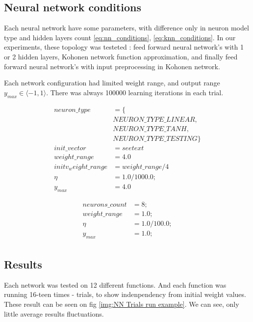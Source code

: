 \documentclass[times]{cpeauth}
\begin{document}
\subsection{Neural network conditions}
Each neural network have some parameters, with difference only in neuron model type
and hidden layers count \ref{eq:nn_conditions}, \ref{eq:knn_conditions}. In our experiments,
these topology was testeted :
feed forward neural network's with 1 or 2 hidden layers, Kohonen network function approximation,
and finally feed forward neural network's with input preprocessing in Kohonen network.

Each network configuration had limited weight range, and output range $y_{max} \in \langle -1, 1 \rangle$.
There was always 100000 learning iterations in each trial.

\begin{align}
\label{eq:nn_conditions}
neuron\_type &= \{ \nonumber \\
                &NEURON\_TYPE\_LINEAR, \nonumber \\
                &NEURON\_TYPE\_TANH, \nonumber \\
                &NEURON\_TYPE\_TESTING \} \nonumber \\
init\_vector &= {see text} \nonumber \\
weight\_range &= 4.0 \nonumber \\
initv_weight\_range &= weight\_range/4 \nonumber \\
\eta &= 1.0/1000.0; \nonumber \\
y_{max} &= 4.0
\end{align}


\begin{align}
\label{eq:knn_conditions}
neurons\_count &= 8; \nonumber \\
weight\_range &= 1.0; \nonumber \\
\eta &= 1.0/100.0; \nonumber \\
y_{max} &= 1.0; \nonumber \\
\end{align}

\newpage
\subsection{Results}

Each network was tested on 12 different functions. And each function was running
16-teen times - trials, to show indenpendency from initial weight values. These
result can be seen on fig \ref{img:NN Trials run example}. We can see, only little average
results fluctuations.
\end{document}
